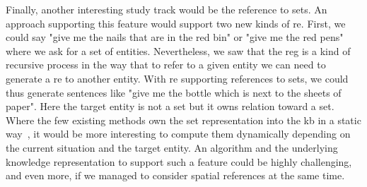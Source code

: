 Finally, another interesting study track would be the reference to sets. An approach supporting this feature would support two new kinds of \acrshort{re}. First, we could say "give me the nails that are in the red bin" or "give me the red pens" where we ask for a set of entities. Nevertheless, we saw that the \acrshort{reg} is a kind of recursive process in the way that to refer to a given entity we can need to generate a \acrshort{re} to another entity. With \acrshort{re} supporting references to sets, we could thus generate sentences like "give me the bottle which is next to the sheets of paper". Here the target entity is not a set but it owns relation toward a set. Where the few existing methods own the set representation into the \acrlong{kb} in a static way~\cite{fang_2013_towards}, it would be more interesting to compute them dynamically depending on the current situation and the target entity. An algorithm and the underlying knowledge representation to support such a feature could be highly challenging, and even more, if we managed to consider spatial references at the same time.